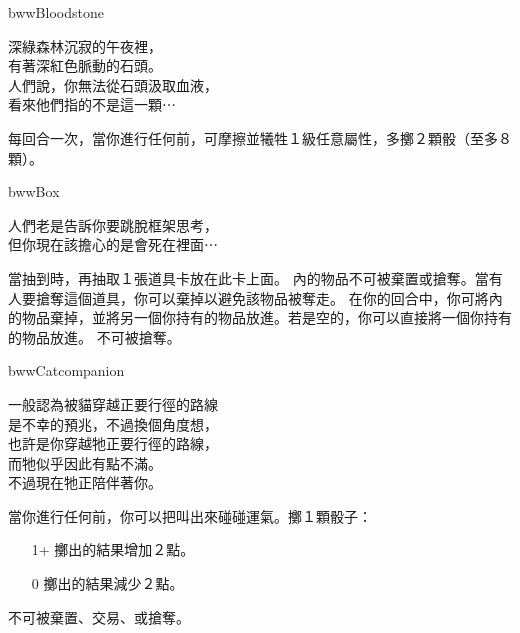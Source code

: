 %
\begin{OmenCard}{bww}{Bloodstone}{}
  \begin{CardStory}
    深綠森林沉寂的午夜裡，\\
    有著深紅色脈動的石頭。\\
    人們說，你無法從石頭汲取血液，\\
    看來他們指的不是這一顆⋯
  \end{CardStory}
  每回合一次，當你進行任何前，可摩擦\ThisName{}並犧牲１級任意屬性，多擲２顆骰（至多８顆）。\smallbreak
\end{OmenCard}%
\linebreak[0]%
\begin{OmenCard}{bww}{Box}{}
  \begin{CardStory}
    人們老是告訴你要跳脫框架思考，\\
    但你現在該擔心的是會死在裡面⋯
  \end{CardStory}
  當抽到\ThisName{}時，再抽取１張道具卡放在此卡上面。\smallbreak
  \ThisName{}內的物品不可被棄置或搶奪。當有人要搶奪這個道具，你可以棄掉\ThisName{}以避免該物品被奪走。\smallbreak
  在你的回合中，你可將\ThisName{}內的物品棄掉，並將另一個你持有的物品放進\ThisName{}。若\ThisName{}是空的，你可以直接將一個你持有的物品放進\ThisName{}。\smallbreak
  \ThisName{}不可被搶奪。\smallbreak
\end{OmenCard}%
\linebreak[0]%
\begin{OmenCard}{bww}{Cat}{companion}
  \begin{CardStory}
    一般認為被貓穿越正要行徑的路線\\
    是不幸的預兆，不過換個角度想，\\
    也許是你穿越牠正要行徑的路線，\\
    而牠似乎因此有點不滿。\\
    不過現在牠正陪伴著你。
  \end{CardStory}
  當你進行任何前，你可以把\ThisName{}叫出來碰碰運氣。擲１顆骰子：
  \begin{itemize}
    \item[1+] 擲出的結果增加２點。
    \item[0] 擲出的結果減少２點。
  \end{itemize}
  \ThisName{}不可被棄置、交易、或搶奪。\smallbreak
\end{OmenCard}%
\linebreak[0]%
